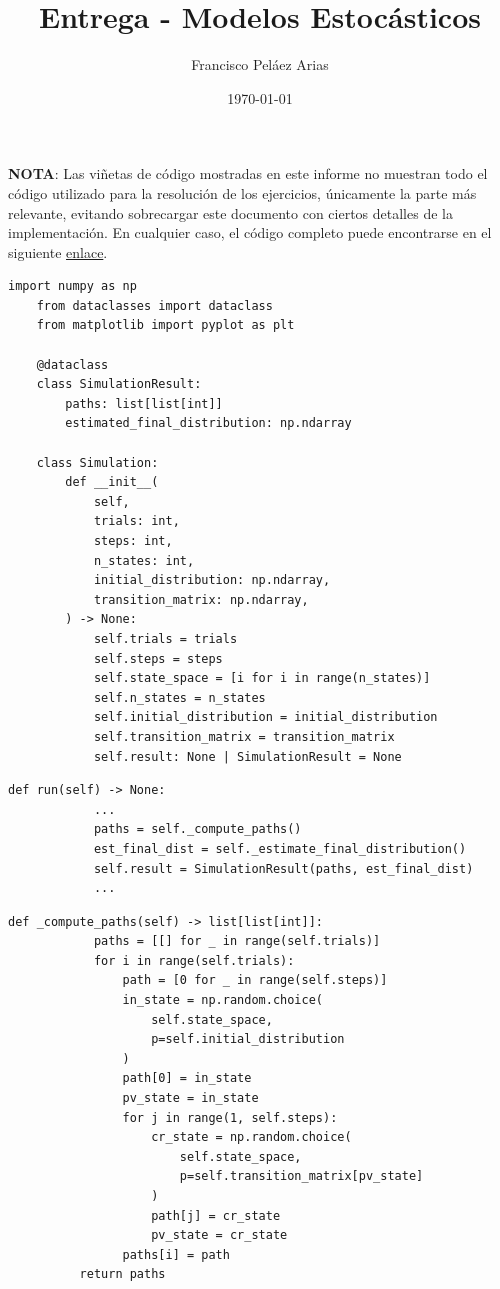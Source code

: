\documentclass[12pt]{article}
\title{Entrega - Modelos Estocásticos}
\author{Francisco Peláez Arias}
\date{\today}
\begin{document}
\maketitle

\textbf{NOTA}: Las viñetas de código mostradas en este informe no muestran todo el código utilizado para la resolución de los ejercicios, únicamente la parte más relevante, evitando sobrecargar este documento con ciertos detalles de la implementación. En cualquier caso, el código completo puede encontrarse en el siguiente \href{https://github.com/frpelaez/markov-sim}{enlace}.

\begin{lstlisting}[title=En src/simulation.py]
    import numpy as np
    from dataclasses import dataclass
    from matplotlib import pyplot as plt  

    @dataclass
    class SimulationResult:
        paths: list[list[int]]
        estimated_final_distribution: np.ndarray

    class Simulation:
        def __init__(
            self,
            trials: int,
            steps: int,
            n_states: int,
            initial_distribution: np.ndarray,
            transition_matrix: np.ndarray,
        ) -> None:
            self.trials = trials
            self.steps = steps
            self.state_space = [i for i in range(n_states)]
            self.n_states = n_states
            self.initial_distribution = initial_distribution
            self.transition_matrix = transition_matrix
            self.result: None | SimulationResult = None

\end{lstlisting}

\begin{lstlisting}[title={En src/simulation.py, después de \_\_init\_\_()}]
        def run(self) -> None:
            ...
            paths = self._compute_paths()
            est_final_dist = self._estimate_final_distribution()
            self.result = SimulationResult(paths, est_final_dist)
            ...
\end{lstlisting}

\vspace{1.3cm}

\begin{lstlisting}[title={En src/simulation.py, después de run()}]
        def _compute_paths(self) -> list[list[int]]:
            paths = [[] for _ in range(self.trials)]
            for i in range(self.trials):
                path = [0 for _ in range(self.steps)]
                in_state = np.random.choice(
                    self.state_space,
                    p=self.initial_distribution
                )
                path[0] = in_state
                pv_state = in_state
                for j in range(1, self.steps):
                    cr_state = np.random.choice(
                        self.state_space,
                        p=self.transition_matrix[pv_state]
                    )
                    path[j] = cr_state
                    pv_state = cr_state
                paths[i] = path
          return paths
\end{lstlisting}
\end{document}
